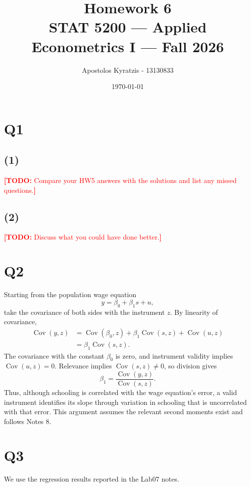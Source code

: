 \documentclass[11pt]{article}
\title{\vspace{-2em}Homework 6\\[0.3em]
       \large STAT 5200 --- Applied Econometrics I --- Fall 2026}
\author{Apostolos Kyratzis - 13130833}
\date{\today}
\DeclareMathOperator{\Cov}{Cov}
\newcommand{\todo}[1]{\textcolor{red}{\textbf{[TODO:} #1\textbf{]}}}
\begin{document}
\maketitle

\clearpage
\section{Q1}
\label{sec:q1}
\subsection{(1)}
\todo{Compare your HW5 answers with the solutions and list any missed questions.}

\subsection{(2)}
\todo{Discuss what you could have done better.}

\clearpage
\section{Q2}
\label{sec:q2}
Starting from the population wage equation
\[
    y=\beta_0+\beta_1s+u,
\]
take the covariance of both sides with the instrument $z$. By linearity of
covariance,
\begin{align*}
    \Cov(y,z)
    &=\Cov(\beta_0,z)+\beta_1\Cov(s,z)+\Cov(u,z)\\
    &=\beta_1\Cov(s,z).
\end{align*}
The covariance with the constant $\beta_0$ is zero, and instrument validity
implies $\Cov(u,z)=0$. Relevance implies $\Cov(s,z)\ne0$, so division gives
\[
    \boxed{\displaystyle \beta_1=\frac{\Cov(y,z)}{\Cov(s,z)}.}
\]
Thus, although schooling is correlated with the wage equation's error, a valid
instrument identifies its slope through variation in schooling that is
uncorrelated with that error. This argument assumes the relevant second moments
exist and follows Notes 8.

\clearpage
\section{Q3}
\label{sec:q3}
We use the regression results reported in the Lab07 notes.
\end{document}
